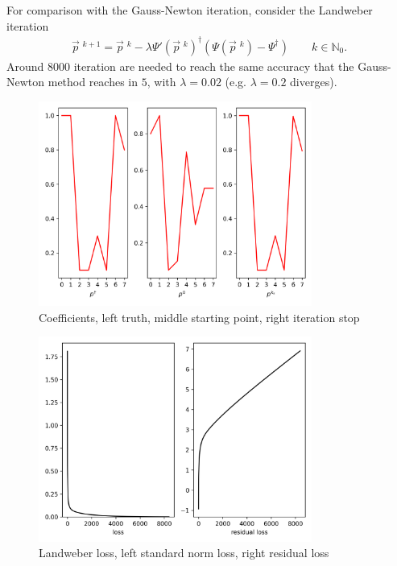 For comparison with the Gauss-Newton iteration, consider the Landweber iteration
\begin{align}
    \vec{p}\;^{k+1} = \vec{p}\;^{k} - \lambda \Psi'\left(\vec{p}\;^{k}  \right)^{\dagger}
    \left( \Psi(\vec{p}\;^{k}) - \Psi^{\dagger} \right) \qquad k \in
    \mathbb{N}_0.
\end{align}
Around $8000$ iteration are needed to reach the same accuracy that the
Gauss-Newton method reaches in $5$, with $\lambda = 0.02$ (e.g. $\lambda=0.2$
diverges).
\begin{figure}[H]
    \centering
    \includegraphics[width=0.8\textwidth]{./pics/lw_coeff.png}
    \caption{Coefficients, left truth, middle starting point, right
    iteration stop}
    \label{fig: lw_coeff}
\end{figure}
\begin{figure}[H]
    \centering
    \includegraphics[width=0.8\textwidth]{./pics/lw_loss.png}
    \caption{Landweber loss, left standard norm loss, right residual loss}
    \label{fig: lw_loss}
\end{figure}

